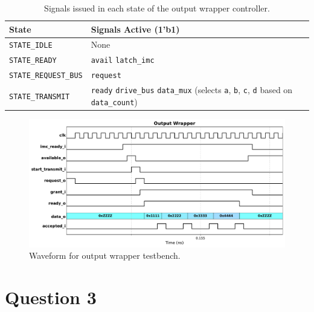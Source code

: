 \documentclass[../main.tex]{subfiles}
\begin{document}
\begin{table}[h]
    \centering
    \renewcommand{\arraystretch}{1.5}
    \setlength{\tabcolsep}{6pt}

    \begin{tabularx}{\textwidth}{@{}l X@{}}
        \toprule
        \textbf{State} & \textbf{Signals Active (1'b1)} \\
        \midrule
        \texttt{STATE\_IDLE} & 
            None \\ 
        \hline
        \texttt{STATE\_READY} & 
            \texttt{avail} \newline
            \texttt{latch\_imc} \\
        \hline
        \texttt{STATE\_REQUEST\_BUS} & 
            \texttt{request} \\
        \hline
        \texttt{STATE\_TRANSMIT} & 
            \texttt{ready} \newline
            \texttt{drive\_bus} \newline
            \texttt{data\_mux} (selects \texttt{a}, \texttt{b}, \texttt{c}, \texttt{d} based on \texttt{data\_count}) \\
        \bottomrule
    \end{tabularx}

    \caption{Signals issued in each state of the output wrapper controller.}
    \label{tab:out_wrapper_state_signals}
\end{table}

\begin{figure}[H]
    \centering
    \includegraphics[width=\linewidth]{assets/q2_out_wrapper_wave.pdf}
    \caption{Waveform for output wrapper testbench.}
    \label{fig:q2_out_wrapper_wave}
\end{figure}

\newpage

\section{Question 3}
\end{document}
